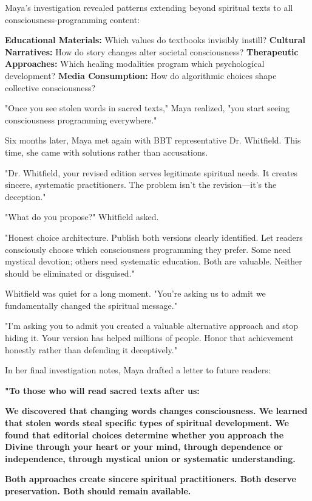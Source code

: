 \documentclass[12pt,twoside]{book}
\begin{document}
Maya's investigation revealed patterns extending beyond spiritual texts to all consciousness-programming content:

\textbf{\textbf{Educational Materials:}} Which values do textbooks invisibly instill?
\textbf{\textbf{Cultural Narratives:}} How do story changes alter societal consciousness?
\textbf{\textbf{Therapeutic Approaches:}} Which healing modalities program which psychological development?
\textbf{\textbf{Media Consumption:}} How do algorithmic choices shape collective consciousness?

"Once you see stolen words in sacred texts," Maya realized, "you start seeing consciousness programming everywhere."

Six months later, Maya met again with BBT representative Dr. Whitfield. This time, she came with solutions rather than accusations.

"Dr. Whitfield, your revised edition serves legitimate spiritual needs. It creates sincere, systematic practitioners. The problem isn't the revision—it's the deception."

"What do you propose?" Whitfield asked.

"Honest choice architecture. Publish both versions clearly identified. Let readers consciously choose which consciousness programming they prefer. Some need mystical devotion; others need systematic education. Both are valuable. Neither should be eliminated or disguised."

Whitfield was quiet for a long moment. "You're asking us to admit we fundamentally changed the spiritual message."

"I'm asking you to admit you created a valuable alternative approach and stop hiding it. Your version has helped millions of people. Honor that achievement honestly rather than defending it deceptively."

In her final investigation notes, Maya drafted a letter to future readers:

\textbf{"To those who will read sacred texts after us:}

\textbf{We discovered that changing words changes consciousness. We learned that stolen words steal specific types of spiritual development. We found that editorial choices determine whether you approach the Divine through your heart or your mind, through dependence or independence, through mystical union or systematic understanding.}

\textbf{Both approaches create sincere spiritual practitioners. Both deserve preservation. Both should remain available.}
\end{document}
